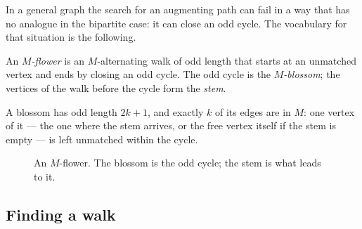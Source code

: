 In a general graph the search for an augmenting path can fail in a way that has
no analogue in the bipartite case: it can close an odd cycle. The vocabulary
for that situation is the following.

\begin{definition}\label{def:matching-flower}
An \emph{$M$-flower} is an $M$-alternating walk of odd length that starts at an
unmatched vertex and ends by closing an odd cycle. The odd cycle is the
\emph{$M$-blossom}; the vertices of the walk before the cycle form the
\emph{stem}.
\end{definition}

A blossom has odd length $2k+1$, and exactly $k$ of its edges are in $M$: one
vertex of it --- the one where the stem arrives, or the free vertex itself if
the stem is empty --- is left unmatched within the cycle.

\begin{figure}[ht]
\centering
{}
\caption{An $M$-flower. The blossom is the odd cycle; the stem is what leads to
it.}
\label{fig:matching-flower}
\end{figure}

\subsection{Finding a walk}
\label{sec:matching-find-walk}

